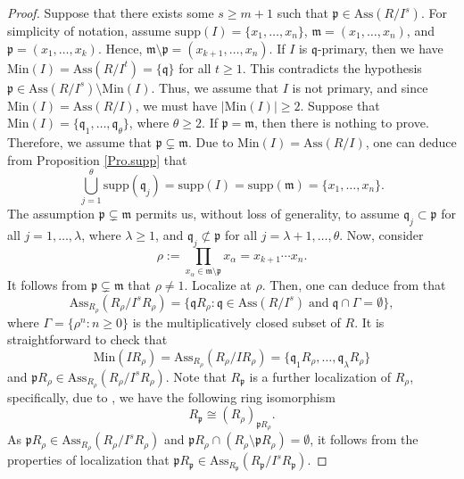 \documentclass[11pt]{amsart}
\begin{document}
\begin{proof}
Suppose that  there exists some $s\geq m+1$ such that $\mathfrak{p}\in \mathrm{Ass}(R/I^s)$. 
 For simplicity of notation, assume  $\mathrm{supp}(I)=\{x_1, \ldots, x_n\}$, $\mathfrak{m}=(x_1, \ldots, x_n)$, and 
 $\mathfrak{p}=(x_1, \ldots, x_k)$. Hence, $\mathfrak{m}\setminus \mathfrak{p}=(x_{k+1}, \ldots, x_n)$. If $I$ is  $\mathfrak{q}$-primary, then we have $\mathrm{Min}(I)=\mathrm{Ass}(R/I^t)=\{\mathfrak{q}\}$ for all $t\geq 1$. This  contradicts the  hypothesis  $\mathfrak{p}\in \mathrm{Ass}(R/I^s)\setminus \mathrm{Min}(I)$. Thus, we assume that  $I$ is not primary, and since 
$\mathrm{Min}(I)=\mathrm{Ass}(R/I)$, we must have   $|\mathrm{Min}(I)|\geq 2$. 
 Suppose that  $\mathrm{Min}(I)=\{\mathfrak{q}_1, \ldots, \mathfrak{q}_\theta\}$, where $\theta\geq 2$. 
    If $\mathfrak{p}=\mathfrak{m}$, then there is nothing to prove. Therefore, we assume that  $\mathfrak{p}\subsetneq \mathfrak{m}$. 
 Due to  $\mathrm{Min}(I)=\mathrm{Ass}(R/I)$, one can deduce from Proposition \ref{Pro.supp} that 
 $$\bigcup_{j=1}^{\theta} \mathrm{supp}(\mathfrak{q}_j)=\mathrm{supp}(I)=\mathrm{supp}(\mathfrak{m})=\{x_1, \ldots, x_n\}.$$ 
 The assumption  $\mathfrak{p}\subsetneq \mathfrak{m}$ permits us, without loss of generality, to assume   $\mathfrak{q}_j\subset \mathfrak{p}$ for all $j=1, \ldots, \lambda$, where $\lambda\geq 1$,   and $\mathfrak{q}_j\not\subset\mathfrak{p}$ for all $j=\lambda+1, \ldots, \theta$.  
 Now, consider  $$\rho:=\prod_{x_{\alpha}\in \mathfrak{m}\setminus \mathfrak{p}}x_{\alpha}=x_{k+1}  \cdots x_n.$$ 
 It follows from   $\mathfrak{p}\subsetneq \mathfrak{m}$    that $\rho \neq 1$.    Localize at $\rho$. 
    Then, one can  deduce from   \cite[Lemma 9.38]{sharp} that 
   $$\mathrm{Ass}_{R_\rho}(R_\rho/I^sR_\rho)=\{\mathfrak{q}R_\rho : \mathfrak{q} \in \mathrm{Ass}(R/I^s) \; \text{and} \; \mathfrak{q} \cap \Gamma
   =\emptyset\},$$ 
   where $\Gamma=\{\rho^n : n \geq 0\}$ is the  multiplicatively closed subset of $R$. It is straightforward to check that 
    $$\mathrm{Min}(IR_{\rho}) =\mathrm{Ass}_{R_\rho}(R_\rho/IR_\rho)=\{\mathfrak{q}_1R_\rho, \ldots, \mathfrak{q}_\lambda R_\rho\}$$ and 
   $\mathfrak{p}R_\rho\in \mathrm{Ass}_{R_\rho}(R_\rho/I^sR_\rho)$.     Note that $R_{\mathfrak{p}}$ is a further localization of $R_{\rho}$, specifically, due to  \cite[Exercise 5.45]{sharp}, we have the following  ring isomorphism $$R_{\mathfrak{p}} \cong (R_{\rho})_{\mathfrak{p}R_{\rho}}.$$ 
    As  $\mathfrak{p}R_{\rho} \in \mathrm{Ass}_{R_{\rho}}(R_{\rho}/I^s R_{\rho})$ and $\mathfrak{p}R_{\rho} \cap (R_{\rho} \setminus \mathfrak{p}R_{\rho}) = \emptyset$,  it follows from the properties of localization that $\mathfrak{p}R_{\mathfrak{p}} \in \mathrm{Ass}_{R_{\mathfrak{p}}}(R_{\mathfrak{p}}/I^s R_{\mathfrak{p}})$.
  

\end{proof}
\end{document}
